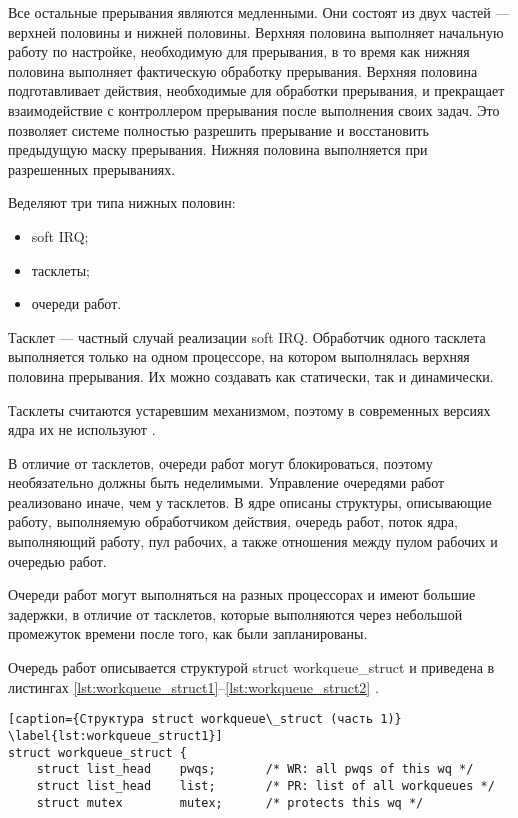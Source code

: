 Все остальные прерывания являются медленными. Они состоят из двух частей --- верхней половины и нижней половины. Верхняя половина выполняет начальную работу по настройке, необходимую для прерывания, в то время как нижняя половина выполняет фактическую обработку прерывания. Верхняя половина подготавливает действия, необходимые для обработки прерывания, и прекращает взаимодействие с контроллером прерывания после выполнения своих задач. Это позволяет системе полностью разрешить прерывание и восстановить предыдущую маску прерывания. Нижняя половина выполняется при разрешенных прерываниях.

Веделяют три типа нижных половин:
\begin{itemize}
    \item soft IRQ;
    \item тасклеты;
    \item очереди работ.
\end{itemize}

Тасклет --- частный случай реализации soft IRQ. Обработчик одного тасклета выполняется только на одном процессоре, на котором выполнялась верхняя половина прерывания. Их можно создавать как статически, так и динамически.

Тасклеты считаются устаревшим механизмом, поэтому в современных
версиях ядра их не используют \cite{tasklet}.

В отличие от тасклетов, очереди работ могут блокироваться, поэтому необязательно должны быть неделимыми. Управление очередями работ реализовано иначе, чем у тасклетов. В ядре описаны структуры, описывающие работу, выполняемую обработчиком действия, очередь работ, поток ядра, выполняющий работу, пул рабочих, а также отношения между пулом рабочих и очередью работ.

Очереди работ могут выполняться на разных процессорах и имеют большие задержки, в отличие от тасклетов, которые выполняются через небольшой промежуток времени после того, как были запланированы. 

Очередь работ описывается структурой struct workqueue\_struct и приведена в листингах \ref{lst:workqueue_struct1}--\ref{lst:workqueue_struct2} \cite{workqueuec}.

\begin{lstlisting}[caption={Структура struct workqueue\_struct (часть 1)} \label{lst:workqueue_struct1}]
struct workqueue_struct {
	struct list_head	pwqs;		/* WR: all pwqs of this wq */
	struct list_head	list;		/* PR: list of all workqueues */
	struct mutex		mutex;		/* protects this wq */
\end{lstlisting}


